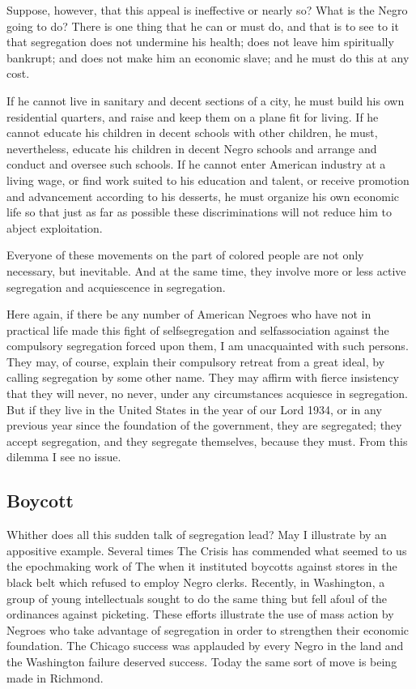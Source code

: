 \documentclass[letterpaper,10pt,english]{jupyterBook}
\begin{document}
\sphinxAtStartPar
Suppose, however, that this appeal is ineffective or nearly so? What is the Negro going to do? There is one thing that he can or must do, and that is to see to it that segregation does not undermine his health; does not leave him spiritually bankrupt; and does not make him an economic slave; and he must do this at any cost.

\sphinxAtStartPar
If he cannot live in sanitary and decent sections of a city, he must build his own residential quarters, and raise and keep them on a plane fit for living. If he cannot educate his children in decent schools with other children, he must, nevertheless, educate his children in decent Negro schools and arrange and conduct and oversee such schools. If he cannot enter American industry at a living wage, or find work suited to his education and talent, or receive promotion and advancement according to his desserts, he must organize his own economic life so that just as far as possible these discriminations will not reduce him to abject exploitation.

\sphinxAtStartPar
Everyone of these movements on the part of colored people are not only necessary, but inevitable. And at the same time, they involve more or less active segregation and acquiescence in segregation.

\sphinxAtStartPar
Here again, if there be any number of American Negroes who have not in practical life made this fight of self\sphinxhyphen{}segregation and self\sphinxhyphen{}association against the compulsory segregation forced upon them, I am unacquainted with such persons. They may, of course, explain their compulsory retreat from a great ideal, by calling segregation by some other name. They may affirm with fierce insistency that they will never, no never, under any circumstances acquiesce in segregation. But if they live in the United States in the year of our Lord 1934, or in any previous year since the foundation of the government, they are segregated; they accept segregation, and they segregate themselves, because they must. From this dilemma I see no issue.


\subsection{Boycott}
\label{\detokenize{Volumes/41/04/segregation_in_the_north:boycott}}
\sphinxAtStartPar
Whither does all this sudden talk of segregation lead? May I illustrate by an appositive example. Several times The Crisis has commended what seemed to us the epoch\sphinxhyphen{}making work of The  when it instituted boycotts against stores in the black belt which refused to employ Negro clerks. Recently, in Washington, a group of young intellectuals sought to do the same thing but fell afoul of the ordinances against picketing. These efforts illustrate the use of mass action by Negroes who take advantage of segregation in order to strengthen their economic foundation. The Chicago success was applauded by every Negro in the land and the Washington failure deserved success. Today the same sort of move is being made in Richmond.
\end{document}
